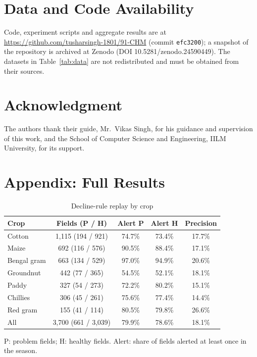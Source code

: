\documentclass[conference]{IEEEtran}
\begin{document}
\section*{Data and Code Availability}
Code, experiment scripts and aggregate results are at \url{https://github.com/tusharsingh-1801/91-CHM} (commit \texttt{efc3200}); a snapshot of the repository is archived at Zenodo (DOI 10.5281/zenodo.24590449). The datasets in Table~\ref{tab:data} are not redistributed and must be obtained from their sources.

\section*{Acknowledgment}
The authors thank their guide, Mr.~Vikas Singh, for his guidance and supervision of this work, and the School of Computer Science and Engineering, IILM University, for its support.

\section*{Appendix: Full Results}
\setcounter{table}{0}
\renewcommand{\thetable}{A\arabic{table}}

\begin{table}[h]
\caption{Decline-rule replay by crop}
\centering
\footnotesize
\begin{tabular}{@{}lcccc@{}}
\toprule
Crop & Fields (P / H) & Alert P & Alert H & Precision \\
\midrule
Cotton & 1,115 (194 / 921) & 74.7\% & 73.4\% & 17.7\% \\
Maize & 692 (116 / 576) & 90.5\% & 88.4\% & 17.1\% \\
Bengal gram & 663 (134 / 529) & 97.0\% & 94.9\% & 20.6\% \\
Groundnut & 442 (77 / 365) & 54.5\% & 52.1\% & 18.1\% \\
Paddy & 327 (54 / 273) & 72.2\% & 80.2\% & 15.1\% \\
Chillies & 306 (45 / 261) & 75.6\% & 77.4\% & 14.4\% \\
Red gram & 155 (41 / 114) & 80.5\% & 79.8\% & 26.6\% \\
All & 3,700 (661 / 3,039) & 79.9\% & 78.6\% & 18.1\% \\
\bottomrule
\end{tabular}

\vspace{2pt}
{\scriptsize P: problem fields; H: healthy fields. Alert: share of fields alerted at least once in the season.}
\end{table}
\end{document}
